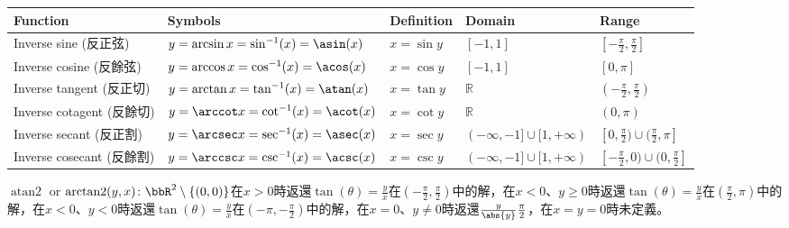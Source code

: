 \documentclass[a4paper,12pt]{report}
\begin{document}
{\fontsize{8pt}{10pt}\selectfont
\begin{longtable}[c]{|p{}|p{}|p{}|p{}|p{}|}
\hline
Function & Symbols & Definition & Domain & Range \\ 
\hline\endhead
    Inverse sine (反正弦) & \(y=\arcsin x=\sin^{-1}(x)=\asin(x)\) & \(x=\sin y\) & \([-1,1]\) & \([-\frac{\pi}{2},\frac{\pi}{2}]\) \\ \hline
    Inverse cosine (反餘弦) & \(y=\arccos x=\cos^{-1}(x)=\acos(x)\) & \(x=\cos y\) & \([-1,1]\) & \([0,\pi]\) \\ \hline
    Inverse tangent (反正切) & \(y=\arctan x=\tan^{-1}(x)=\atan(x)\) & \(x=\tan y\) & \(\mathbb{R}\) & \((-\frac{\pi}{2},\frac{\pi}{2})\) \\ \hline
    Inverse cotagent (反餘切) & \(y=\arccot x=\cot^{-1}(x)=\acot(x)\) & \(x=\cot y\) & \(\mathbb{R}\) & \((0,\pi)\) \\ \hline
    Inverse secant (反正割) & \(y=\arcsec x=\sec^{-1}(x)=\asec(x)\) & \(x=\sec y\) & \((-\infty,-1]\cup[1,+\infty)\) & \([0,\frac{\pi}{2})\cup(\frac{\pi}{2},\pi]\) \\ \hline
    Inverse cosecant (反餘割) & \(y=\arccsc x=\csc^{-1}(x)=\acsc(x)\) & \(x=\csc y\) & \((-\infty,-1]\cup[1,+\infty)\) & \([-\frac{\pi}{2},0)\cup(0,\frac{\pi}{2}]\) \\ \hline
\end{longtable}
    \FB}
$\operatorname{atan2}$ or $\operatorname{arctan2}(y,x)\colon\bbR^2\setminus\{(0,0)\}$在$x>0$時返還$\tan(\theta)=\frac{y}{x}$在$(-\frac{\pi}{2},\frac{\pi}{2})$中的解，在$x<0$、$y\geq 0$時返還$\tan(\theta)=\frac{y}{x}$在$(\frac{\pi}{2},\pi)$中的解，在$x<0$、$y<0$時返還$\tan(\theta)=\frac{y}{x}$在$(-\pi,-\frac{\pi}{2})$中的解，在$x=0$、$y\neq 0$時返還$\frac{y}{\abs{y}}\frac{\pi}{2}$，在$x=y=0$時未定義。
\end{document}
